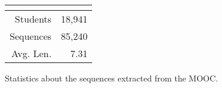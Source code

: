 \begin{margintable}
  \vspace{-5.1in}
  \begin{center}
    \begin{tabular}{rr}
      \multicolumn{2}{c}{\textbf{\textretrieval{}}}\\\hline
      Students & 18,941\\
      Sequences & 85,240\\
      Avg. Len. & 7.31
    \end{tabular}
    \caption{Statistics about the sequences extracted from the MOOC.}
    \label{table:datasets}
  \end{center}
\end{margintable}
